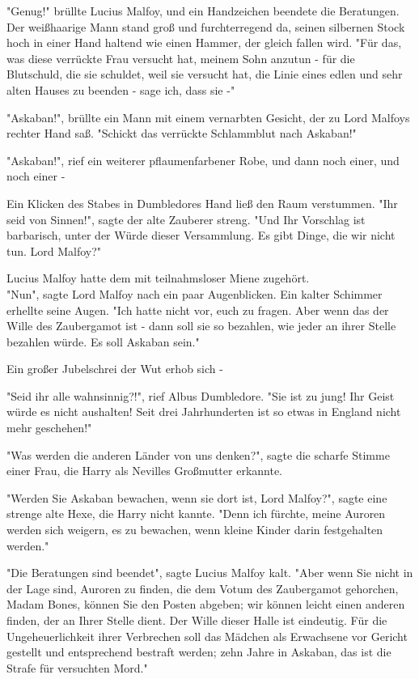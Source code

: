 {"Genug!" brüllte Lucius Malfoy, und ein Handzeichen beendete die Beratungen. Der weißhaarige Mann stand groß und furchterregend da, seinen silbernen Stock hoch in einer Hand haltend wie einen Hammer, der gleich fallen wird. "Für das, was diese verrückte Frau versucht hat, meinem Sohn anzutun - für die Blutschuld, die sie schuldet, weil sie versucht hat, die Linie eines edlen und sehr alten Hauses zu beenden - sage ich, dass sie -"

"Askaban!", brüllte ein Mann mit einem vernarbten Gesicht, der zu Lord Malfoys rechter Hand saß. "Schickt das verrückte Schlammblut nach Askaban!"

"Askaban!", rief ein weiterer pflaumenfarbener Robe, und dann noch einer, und noch einer -

Ein Klicken des Stabes in Dumbledores Hand ließ den Raum verstummen. "Ihr seid von Sinnen!", sagte der alte Zauberer streng. "Und Ihr Vorschlag ist barbarisch, unter der Würde dieser Versammlung. Es gibt Dinge, die wir nicht tun. Lord Malfoy?"

Lucius Malfoy hatte dem mit teilnahmsloser Miene zugehört.\\ "Nun", sagte Lord Malfoy nach ein paar Augenblicken. Ein kalter Schimmer erhellte seine Augen. "Ich hatte nicht vor, euch zu fragen. Aber wenn das der Wille des Zaubergamot ist - dann soll sie so bezahlen, wie jeder an ihrer Stelle bezahlen würde. Es soll Askaban sein."

Ein großer Jubelschrei der Wut erhob sich -

"Seid ihr alle wahnsinnig?!", rief Albus Dumbledore. "Sie ist zu jung! Ihr Geist würde es nicht aushalten! Seit drei Jahrhunderten ist so etwas in England nicht mehr geschehen!"

"Was werden die anderen Länder von uns denken?", sagte die scharfe Stimme einer Frau, die Harry als Nevilles Großmutter erkannte.

"Werden Sie Askaban bewachen, wenn sie dort ist, Lord Malfoy?", sagte eine strenge alte Hexe, die Harry nicht kannte. "Denn ich fürchte, meine Auroren werden sich weigern, es zu bewachen, wenn kleine Kinder darin festgehalten werden."

"Die Beratungen sind beendet", sagte Lucius Malfoy kalt. "Aber wenn Sie nicht in der Lage sind, Auroren zu finden, die dem Votum des Zaubergamot gehorchen, Madam Bones, können Sie den Posten abgeben; wir können leicht einen anderen finden, der an Ihrer Stelle dient. Der Wille dieser Halle ist eindeutig. Für die Ungeheuerlichkeit ihrer Verbrechen soll das Mädchen als Erwachsene vor Gericht gestellt und entsprechend bestraft werden; zehn Jahre in Askaban, das ist die Strafe für versuchten Mord."

}
